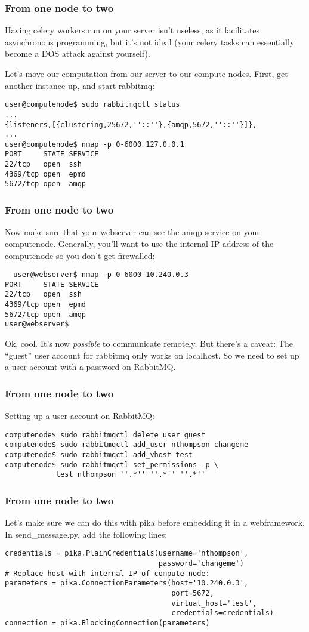 \documentclass[9pt]{beamer}
\begin{document}
\begin{frame}[fragile]
  \frametitle{From one node to two}
  Having celery workers run on your server isn't useless, as it facilitates asynchronous programming, but it's not ideal (your celery tasks can essentially become a DOS attack against yourself).
  
  Let's move our computation from our server to our compute nodes. First, get another instance up, and start rabbitmq:

  \begin{verbatim}
user@computenode$ sudo rabbitmqctl status
...
{listeners,[{clustering,25672,''::''},{amqp,5672,''::''}]},
...
user@computenode$ nmap -p 0-6000 127.0.0.1
PORT     STATE SERVICE
22/tcp   open  ssh
4369/tcp open  epmd
5672/tcp open  amqp
  \end{verbatim}

\end{frame}

\begin{frame}[fragile]
  \frametitle{From one node to two}
  Now make sure that your webserver can see the amqp service on your computenode. Generally, you'll want to use the internal IP address of the computenode so you don't get firewalled:
\begin{verbatim}
  user@webserver$ nmap -p 0-6000 10.240.0.3
PORT     STATE SERVICE
22/tcp   open  ssh
4369/tcp open  epmd
5672/tcp open  amqp
user@webserver$ 
\end{verbatim}
Ok, cool. It's now \emph{possible} to communicate remotely. But there's a caveat: The ``guest'' user account for rabbitmq only works on localhost. So we need to set up a user account with a password on RabbitMQ.
\end{frame}

\begin{frame}[fragile]
  \frametitle{From one node to two}
  Setting up a user account on RabbitMQ:
  \begin{verbatim}
computenode$ sudo rabbitmqctl delete_user guest
computenode$ sudo rabbitmqctl add_user nthompson changeme
computenode$ sudo rabbitmqctl add_vhost test
computenode$ sudo rabbitmqctl set_permissions -p \ 
            test nthompson ''.*'' ''.*'' ''.*''
  \end{verbatim}
\end{frame}

\begin{frame}[fragile]
  \frametitle{From one node to two}
  Let's make sure we can do this with pika before embedding it in a webframework. In send\_message.py, add the following lines:
  \begin{verbatim}
credentials = pika.PlainCredentials(username='nthompson',
                                    password='changeme')
# Replace host with internal IP of compute node:
parameters = pika.ConnectionParameters(host='10.240.0.3',
                                       port=5672,
                                       virtual_host='test',
                                       credentials=credentials)
connection = pika.BlockingConnection(parameters)
  \end{verbatim}
\end{frame}
\end{document}
